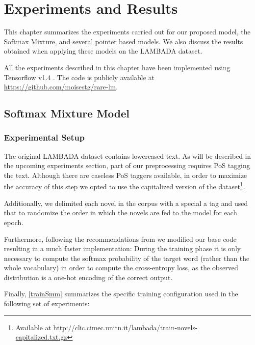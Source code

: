 \chapter{Experiments and Results}
\label{chapter:experiments}

This chapter summarizes the experiments carried out for our proposed model, the Softmax Mixture, and several pointer based models. We also discuss the results obtained when applying these models on the LAMBADA dataset.

All the experiments described in this chapter have been implemented using Tensorflow v1.4 \cite{tensorflow2015}. The code is publicly available at \url{https://github.com/moisestg/rare-lm}.

\section{Softmax Mixture Model}

\subsection{Experimental Setup}

The original LAMBADA dataset contains lowercased text. As will be described in the upcoming experiments section, part of our preprocessing requires PoS tagging the text. Although there are caseless PoS taggers available, in order to maximize the accuracy of this step we opted to use the capitalized version of the dataset\footnote{Available at \url{http://clic.cimec.unitn.it/lambada/train-novels-capitalized.txt.gz}}.

Additionally, we delimited each novel in the corpus with a special a tag and used that to randomize the order in which the novels are fed to the model for each epoch.

Furthermore, following the recommendations from \cite{merity2016pointer} we modified our base code resulting in a much faster implementation: During the training phase it is only necessary to compute the softmax probability of the target word (rather than the whole vocabulary) in order to compute the cross-entropy loss, as the observed distribution is a one-hot encoding of the correct output.

Finally, \autoref{trainSmm} summarizes the specific training configuration used in the following set of experiments:

